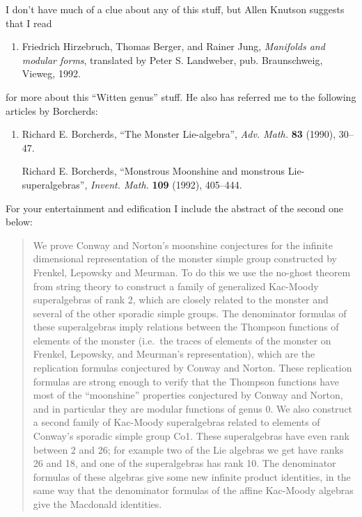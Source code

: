 \documentclass{article}
\def\tightlist{}
\begin{document}
I don't have much of a clue about any of this stuff, but Allen Knutson
suggests that I read

\begin{enumerate}
\def\labelenumi{\arabic{enumi})}
\setcounter{enumi}{5}
\tightlist
\item
  Friedrich Hirzebruch, Thomas Berger, and Rainer Jung, \emph{Manifolds
  and modular forms}, translated by Peter S. Landweber, pub.
  Braunschweig, Vieweg, 1992.
\end{enumerate}

for more about this ``Witten genus'' stuff. He also has referred me to
the following articles by Borcherds:

\begin{enumerate}
\def\labelenumi{\arabic{enumi})}
\setcounter{enumi}{6}
\item
  Richard E. Borcherds, ``The Monster Lie-algebra'', \emph{Adv. Math.}
  \textbf{83} (1990), 30--47.

  Richard E. Borcherds, ``Monstrous Moonshine and monstrous
  Lie-superalgebras'', \emph{Invent. Math.} \textbf{109} (1992),
  405--444.
\end{enumerate}

For your entertainment and edification I include the abstract of the
second one below:

\begin{quote}
We prove Conway and Norton's moonshine conjectures for the infinite
dimensional representation of the monster simple group constructed by
Frenkel, Lepowsky and Meurman. To do this we use the no-ghost theorem
from string theory to construct a family of generalized Kac-Moody
superalgebras of rank 2, which are closely related to the monster and
several of the other sporadic simple groups. The denominator formulas of
these superalgebras imply relations between the Thompson functions of
elements of the monster (i.e.~the traces of elements of the monster on
Frenkel, Lepowsky, and Meurman's representation), which are the
replication formulas conjectured by Conway and Norton. These replication
formulas are strong enough to verify that the Thompson functions have
most of the ``moonshine'' properties conjectured by Conway and Norton,
and in particular they are modular functions of genus 0. We also
construct a second family of Kac-Moody superalgebras related to elements
of Conway's sporadic simple group Co1. These superalgebras have even
rank between 2 and 26; for example two of the Lie algebras we get have
ranks 26 and 18, and one of the superalgebras has rank 10. The
denominator formulas of these algebras give some new infinite product
identities, in the same way that the denominator formulas of the affine
Kac-Moody algebras give the Macdonald identities.
\end{quote}
\end{document}
